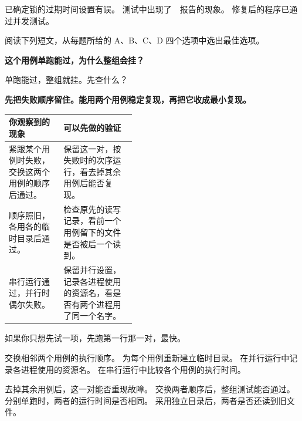 \documentclass[UTF8, zihao=5, a4paper, fontset=fandol]{ctexart}
\begin{document}
\threechoices
  {已确定锁的过期时间设置有误。}
  {测试中出现了~\utag~报告的现象。}
  {修复后的程序已通过并发测试。}



阅读下列短文，从每题所给的 A、B、C、D 四个选项中选出最佳选项。


\begin{center}
{\heiti\bfseries 这个用例单跑能过，为什么整组会挂？}
\end{center}

\noindent\urole 单跑能过，整组就挂。先查什么？

\smallskip
\noindent\arole\textbf{先把失败顺序留住。能用两个用例稳定复现，再把它收成最小复现。}

\smallskip
\begingroup
\renewcommand{\arraystretch}{1.26}
\noindent\begin{tabularx}{\linewidth}{@{}p{0.43\linewidth}X@{}}
\toprule
\textbf{你观察到的现象} & \textbf{可以先做的验证} \\
\midrule
紧跟某个用例时失败，交换这两个用例的顺序后通过。 &
保留这一对，按失败时的次序运行，看去掉其余用例后能否复现。 \\
\addlinespace[2pt]
顺序照旧，各用各的临时目录后通过。 &
检查原先的读写记录，看前一个用例留下的文件是否被后一个读到。 \\
\addlinespace[2pt]
串行运行通过，并行时偶尔失败。 &
保留并行设置，记录各进程使用的资源名，看是否有两个进程用了同一个名字。 \\
\bottomrule
\end{tabularx}
\endgroup

\smallskip
如果你只想先试一项，先跑第一行那一对，最快。

\fourchoices
  {交换相邻两个用例的执行顺序。}
  {为每个用例重新建立临时目录。}
  {在并行运行中记录各进程使用的资源名。}
  {在串行运行中比较各个用例的执行时间。}

\fourchoices
  {去掉其余用例后，这一对能否重现故障。}
  {交换两者顺序后，整组测试能否通过。}
  {分别单跑时，两者的运行时间是否相同。}
  {采用独立目录后，两者是否还读到旧文件。}
\end{document}
